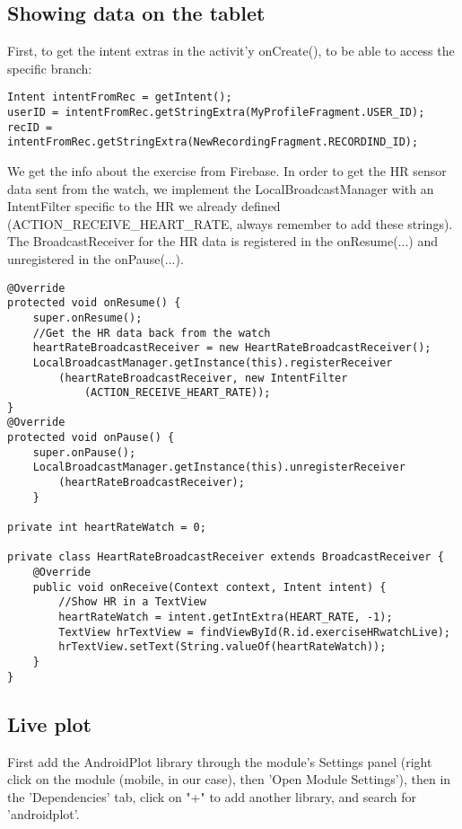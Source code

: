 \documentclass[11pt]{article}
\begin{document}
\subsection{Showing data on the tablet}
First, to get the intent extras in the activit'y onCreate(), to be able to access the specific branch:
\begin{lstlisting}
Intent intentFromRec = getIntent();
userID = intentFromRec.getStringExtra(MyProfileFragment.USER_ID);
recID = intentFromRec.getStringExtra(NewRecordingFragment.RECORDIND_ID);
\end{lstlisting}
We get the info about the exercise from Firebase. %
In order to get the HR sensor data sent from the watch, we implement the LocalBroadcastManager with an IntentFilter specific to the HR we already defined (ACTION\_RECEIVE\_HEART\_RATE, always remember to add these strings). The BroadcastReceiver for the HR data is registered in the onResume(...) and unregistered in the onPause(...).
\begin{lstlisting}
@Override
protected void onResume() {
    super.onResume();
    //Get the HR data back from the watch
    heartRateBroadcastReceiver = new HeartRateBroadcastReceiver();
    LocalBroadcastManager.getInstance(this).registerReceiver
        (heartRateBroadcastReceiver, new IntentFilter
            (ACTION_RECEIVE_HEART_RATE));
}
@Override
protected void onPause() {
    super.onPause();
    LocalBroadcastManager.getInstance(this).unregisterReceiver
        (heartRateBroadcastReceiver);
    }
    
private int heartRateWatch = 0;

private class HeartRateBroadcastReceiver extends BroadcastReceiver {
    @Override
    public void onReceive(Context context, Intent intent) {
        //Show HR in a TextView
        heartRateWatch = intent.getIntExtra(HEART_RATE, -1);
        TextView hrTextView = findViewById(R.id.exerciseHRwatchLive);
        hrTextView.setText(String.valueOf(heartRateWatch));
    }
}
\end{lstlisting}

\subsection{Live plot}
First add the AndroidPlot library through the module's Settings panel (right click on the module (mobile, in our case), then 'Open Module Settings'), then in the 'Dependencies' tab, click on "+" to add another library, and search for 'androidplot'.
\end{document}
